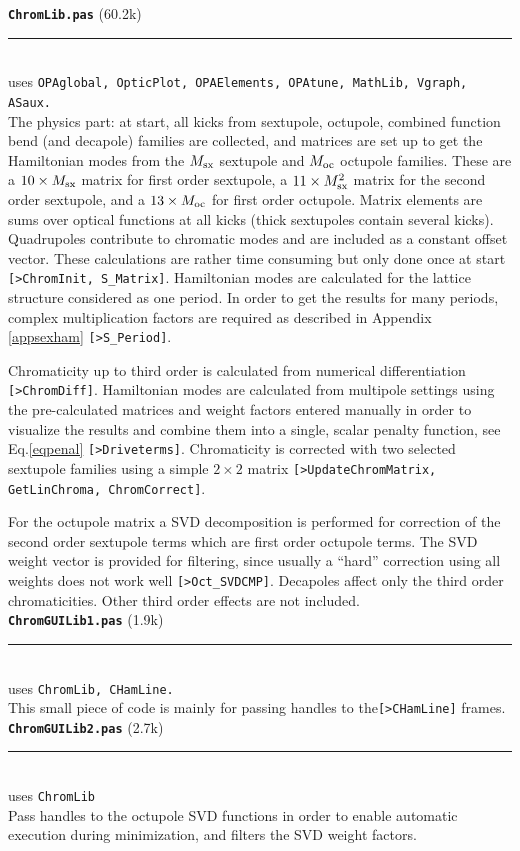 \documentclass[12pt]{article}
\newcommand\code[1]{{\tt [#1]}}
\newcommand\opamodule[3]{{\bf \tt #1} #2\\  \rule[3pt]{\textwidth}{0.2pt} \\ {\scriptsize uses \tt  #3}\\[1ex]}
\begin{document}
\opamodule{ChromLib.pas}{(60.2k)}{OPAglobal, OpticPlot, OPAElements, OPAtune,  MathLib, Vgraph, ASaux.}
The physics part: at start, all kicks from sextupole, octupole, combined function bend (and decapole) families are collected, and matrices are set up to get the Hamiltonian modes from the $M_{\rm sx}$ sextupole and $M_{\rm oc}$ octupole families. These are a $10\times  M_{\rm sx}$ matrix for first order sextupole, a $11\times  M_{\rm sx}^2$ matrix for the second order sextupole, and a  $13\times  M_{\rm oc}$ for first order octupole. Matrix elements are sums over optical functions at all kicks (thick sextupoles contain several kicks). Quadrupoles contribute to chromatic modes and are included as a constant offset vector. These calculations are rather time consuming but only done once at start \code{>ChromInit, S\_Matrix}. Hamiltonian modes are calculated for the lattice structure considered as one period. In order to get the results for many periods, complex multiplication factors are required as described in Appendix \ref{appsexham} \code{>S\_Period}.

Chromaticity up to third order is calculated from numerical differentiation \code{>ChromDiff}. Hamiltonian modes are calculated from multipole settings using the pre-calculated matrices and weight factors entered manually in order to visualize the results and combine them into a single, scalar penalty function, see Eq.\ref{eqpenal} \code{>Driveterms}. Chromaticity is corrected with two selected sextupole families using a simple $2\times 2$ matrix \code{>UpdateChromMatrix, GetLinChroma, ChromCorrect}.

For the octupole matrix a SVD decomposition is performed for correction of the second order sextupole terms which are first order octupole terms. The SVD weight vector is provided for filtering, since usually a ``hard'' correction using all weights does not work well \code{>Oct\_SVDCMP}.
Decapoles affect only the third order chromaticities. Other third order effects are not included.\\

\opamodule{ChromGUILib1.pas}{(1.9k)}{ChromLib, CHamLine.}
This small piece of code is mainly for passing handles to the\code{>CHamLine} frames.\\

\opamodule{ChromGUILib2.pas}{(2.7k)}{ChromLib}
Pass handles to the octupole SVD functions in order to enable automatic execution during minimization, and filters the SVD weight factors.\\
\end{document}
